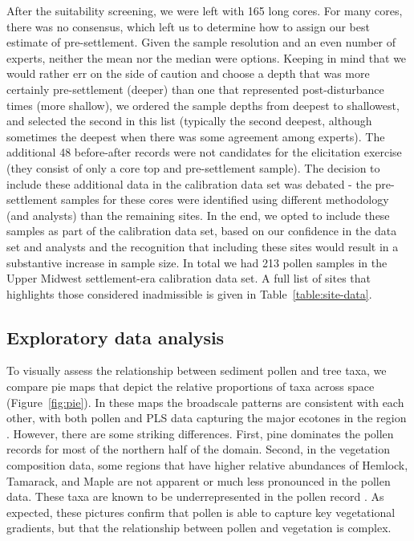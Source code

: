 \documentclass[12pt]{article}
\begin{document}
After the suitability screening, we were left with 165 long cores. For
many cores, there was no consensus, which left us to determine how to
assign our best estimate of pre-settlement. Given the sample
resolution and an even number of experts, neither the mean nor the
median were options. Keeping in mind that we would rather err on the
side of caution and choose a depth that was more certainly
pre-settlement (deeper) than one that represented post-disturbance
times (more shallow), we ordered the sample depths from deepest to
shallowest, and selected the second in this list (typically the second
deepest, although sometimes the deepest when there was some agreement
among experts).  The additional 48 before-after records were not
candidates for the elicitation exercise (they consist of only a core
top and pre-settlement sample). The decision to include these
additional data in the calibration data set was debated - the
pre-settlement samples for these cores were identified using different
methodology (and analysts) than the remaining sites. In the end, we
opted to include these samples as part of the calibration data set,
based on our confidence in the data set and analysts and the
recognition that including these sites would result in a substantive
increase in sample size. In total we had 213 pollen samples in the
Upper Midwest settlement-era calibration data set. A full list of
sites that highlights those considered inadmissible is given in
Table~\ref{table:site-data}.

\subsection{Exploratory data analysis}

To visually assess the relationship between sediment pollen and tree
taxa, we compare pie maps that depict the relative proportions of
taxa across space (Figure~\ref{fig:pie}). In these maps the broadscale
patterns are consistent with each other, with both pollen and PLS data
capturing the major ecotones in the region
\citep{solomon1985computer}.  However, there are some striking
differences. First, pine dominates the pollen records for most of the
northern half of the domain. Second, in the vegetation composition
data, some regions that have higher relative abundances of Hemlock,
Tamarack, and Maple are not apparent or much less pronounced in the
pollen data. These taxa are known to be underrepresented in the pollen
record \citep{XXX}. As expected, these pictures confirm that pollen is able
to capture key vegetational gradients, but that the relationship
between pollen and vegetation is complex.
\end{document}
